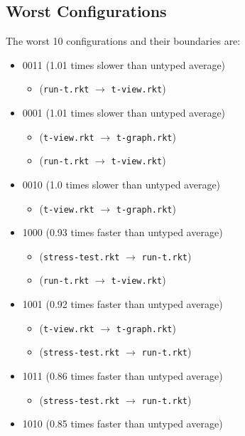 \documentclass{article}
\newcommand{\mono}[1]{\texttt{#1}}
\begin{document}
\subsection{Worst Configurations}
The worst 10 configurations and their boundaries are:
\begin{itemize}
\item 0011 (1.01 times slower than untyped average)
  \begin{itemize}
  \item (\mono{run-t.rkt} $\rightarrow$ \mono{t-view.rkt})
  \end{itemize}
\item 0001 (1.01 times slower than untyped average)
  \begin{itemize}
  \item (\mono{t-view.rkt} $\rightarrow$ \mono{t-graph.rkt})
  \item (\mono{run-t.rkt} $\rightarrow$ \mono{t-view.rkt})
  \end{itemize}
\item 0010 (1.0 times slower than untyped average)
  \begin{itemize}
  \item (\mono{t-view.rkt} $\rightarrow$ \mono{t-graph.rkt})
  \end{itemize}
\item 1000 (0.93 times faster than untyped average)
  \begin{itemize}
  \item (\mono{stress-test.rkt} $\rightarrow$ \mono{run-t.rkt})
  \item (\mono{run-t.rkt} $\rightarrow$ \mono{t-view.rkt})
  \end{itemize}
\item 1001 (0.92 times faster than untyped average)
  \begin{itemize}
  \item (\mono{t-view.rkt} $\rightarrow$ \mono{t-graph.rkt})
  \item (\mono{stress-test.rkt} $\rightarrow$ \mono{run-t.rkt})
  \end{itemize}
\item 1011 (0.86 times faster than untyped average)
  \begin{itemize}
  \item (\mono{stress-test.rkt} $\rightarrow$ \mono{run-t.rkt})
  \end{itemize}
\item 1010 (0.85 times faster than untyped average)
  \begin{itemize}

\end{itemize}
\end{itemize}
\end{document}
